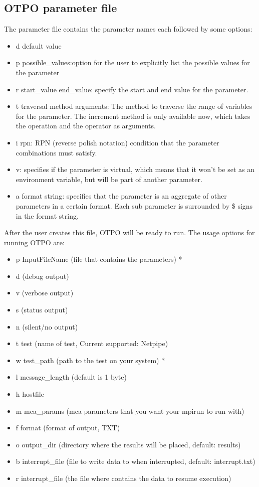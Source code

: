 \subsection{OTPO parameter file}

The parameter file contains the parameter names each followed by some options:
\begin{itemize}
\item d default value
\item p {possible\_values}:option for the user to explicitly list the possible
  values for the parameter
\item r start\_value end\_value: specify the start and end value for the
  parameter.
\item t traversal method arguments: The method to traverse the range of
  variables for the parameter. The increment method is only available now,
  which takes the operation and the operator as arguments.
\item i rpn: RPN (reverse polish notation) condition that the parameter
  combinations must satisfy.
\item v: specifies if the parameter is virtual, which means that it won't be
  set as an environment variable, but will be part of another parameter.
\item a {format string}: specifies that the parameter is an aggregate of
  other parameters in a certain format. Each sub parameter is surrounded by \$
  signs in the format string.
\end{itemize}

After the user creates this file, OTPO will be ready to run. The usage options
for running OTPO are:
\begin{itemize}
\item p InputFileName (file that contains the parameters) *
\item d (debug output)
\item v (verbose output)
\item s (status output)
\item n (silent/no output)
\item t test (name of test, Current supported: Netpipe)
\item w test\_path (path to the test on your system) *
\item l message\_length (default is 1 byte)
\item h hostfile
\item m mca\_params (mca parameters that you want your mpirun to run with)
\item f format (format of output, TXT)
\item o output\_dir (directory where the results will be placed, default: results)
\item b interrupt\_file (file to write data to when interrupted, default:
  interrupt.txt)
\item r interrupt\_file (the file where contains the data to resume execution) 
\end{itemize}

